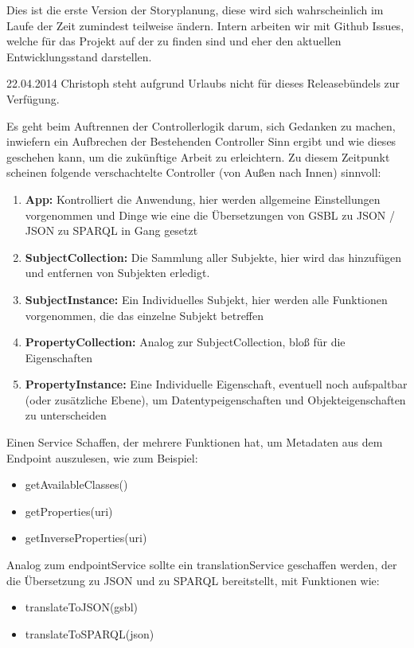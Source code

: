 Dies ist die erste Version der Storyplanung, diese wird sich wahrscheinlich im Laufe der Zeit zumindest teilweise ändern. Intern arbeiten wir mit Github Issues, welche für das Projekt auf der  zu finden sind und eher den aktuellen Entwicklungsstand darstellen.

\begin{release}{22.04.2014}
Christoph steht aufgrund Urlaubs nicht für dieses Releasebündels zur Verfügung.

%
Es geht beim Auftrennen der Controllerlogik darum, sich Gedanken zu machen, inwiefern ein Aufbrechen der Bestehenden Controller Sinn ergibt und wie dieses geschehen kann, um die zukünftige Arbeit zu erleichtern. Zu diesem Zeitpunkt scheinen folgende verschachtelte Controller (von Außen nach Innen) sinnvoll:
\begin{enumerate}
\item \textbf{App:} Kontrolliert die Anwendung, hier werden allgemeine Einstellungen vorgenommen und Dinge wie eine die Übersetzungen von GSBL zu JSON / JSON zu SPARQL in Gang gesetzt
\item\textbf{SubjectCollection:} Die Sammlung aller Subjekte, hier wird das hinzufügen und entfernen von Subjekten erledigt.
\item\textbf{SubjectInstance:} Ein Individuelles Subjekt, hier werden alle Funktionen vorgenommen, die das einzelne Subjekt betreffen
\item\textbf{PropertyCollection:} Analog zur SubjectCollection, bloß für die Eigenschaften
\item\textbf{PropertyInstance:} Eine Individuelle Eigenschaft, eventuell noch aufspaltbar (oder zusätzliche Ebene), um Datentypeigenschaften und Objekteigenschaften zu unterscheiden
\end{enumerate}

\Hack{\enlargethispage{2.5\baselineskip}}
%
Einen Service Schaffen, der mehrere Funktionen hat, um Metadaten aus dem Endpoint auszulesen, wie zum Beispiel:
\begin{itemize}
\item getAvailableClasses()
\item getProperties(uri) 
\item getInverseProperties(uri)
\end{itemize}

%
Analog zum endpointService sollte ein translationService geschaffen werden, der die Übersetzung zu JSON und zu SPARQL bereitstellt, mit Funktionen wie:
\begin{itemize}
\item translateToJSON(gsbl)
\item translateToSPARQL(json)
\end{itemize}


\end{release}
